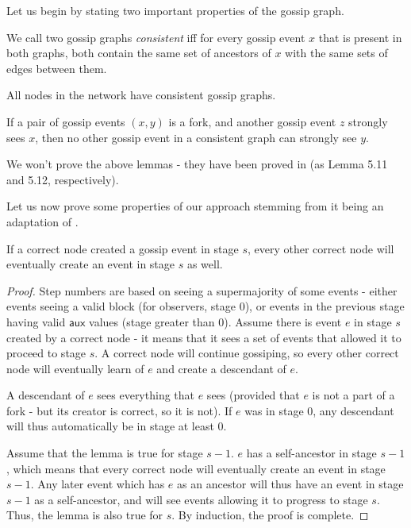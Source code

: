 \documentclass[a4paper,fleqn]{article}
\begin{document}
Let us begin by stating two important properties of the gossip graph.

\begin{defn}
	We call two gossip graphs \emph{consistent} iff for every gossip event $x$ that is present in
	both graphs, both contain the same set of ancestors of $x$ with the same sets of edges between
	them.
\end{defn}

\begin{lem}\label{consistency}
	All nodes in the network have consistent gossip graphs.
\end{lem}

\begin{lem}\label{stronglysee}
	If a pair of gossip events $(x,y)$ is a fork, and another gossip event $z$ strongly sees $x$,
	then no other gossip event in a consistent graph can strongly see $y$.
\end{lem}

We won't prove the above lemmas - they have been proved in \cite{hg} (as Lemma 5.11 and 5.12,
respectively).

Let us now prove some properties of our approach stemming from it being an adaptation of
\cite{aba}.

\begin{lem}[Progress]\label{progress}
	If a correct node created a gossip event in stage $s$, every other correct node will eventually
	create an event in stage $s$ as well.
\end{lem}

\begin{proof}
	Step numbers are based on seeing a supermajority of some events - either events seeing a valid
	block (for observers, stage 0), or events in the previous stage having valid $\mathsf{aux}$
	values (stage greater than 0). Assume there is event $e$ in stage $s$ created by a correct node
	- it means that it sees a set of events that allowed it to proceed to stage $s$. A correct node
	will continue gossiping, so every other correct node will eventually learn of $e$ and create a
	descendant of $e$.

	A descendant of $e$ sees everything that $e$ sees (provided that $e$ is not a part of a fork -
	but its creator is correct, so it is not). If $e$ was in stage 0, any descendant will thus
	automatically be in stage at least 0.

	Assume that the lemma is true for stage $s-1$. $e$ has a self-ancestor in stage $s-1$, which
	means that every correct node will eventually create an event in stage $s-1$. Any later event
	which has $e$ as an ancestor will thus have an event in stage $s-1$ as a self-ancestor, and
	will see events allowing it to progress to stage $s$. Thus, the lemma is also true for $s$. By
	induction, the proof is complete.
\end{proof}
\end{document}
